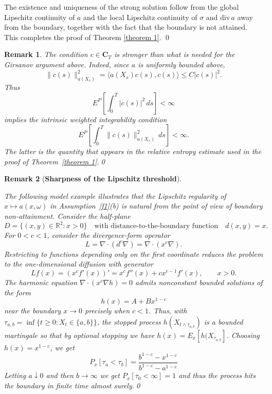 \documentclass[11pt]{article}
\newcommand{\R}{\mathbb R}
\theoremstyle{rem}
\newtheorem{remark}{Remark}[section]
\begin{document}
The existence and uniqueness of the strong solution follow from the global Lipschitz continuity of $a$ and the local Lipschitz continuity of $\sigma$ and $\mathrm{div}\,a$ away from the boundary, together with the fact that the boundary is not attained. This completes the proof of Theorem \ref{theorem 1}.
\qed

\begin{remark}\label{remark:weighted}
The condition $c\in \mathbf C_T$ is stronger than what is needed for the
Girsanov argument above. Indeed, since $a$ is uniformly bounded above,
\[
\|c(s)\|_{a(X_s)}^2
=
\langle a(X_s)c(s),c(s)\rangle
\leq C |c(s)|^2.
\]
Thus
\[
E^P\left[\int_0^T |c(s)|^2\,ds\right]<\infty
\]
implies the intrinsic weighted integrability condition
\[
E^P\left[\int_0^T \|c(s)\|_{a(X_s)}^2\,ds\right]<\infty.
\]
The latter is the quantity that appears in the relative entropy estimate
used in the proof of Theorem~\ref{theorem 1}.\qed 
\end{remark}

\begin{remark}[{\bf Sharpness of the Lipschitz threshold}]
\label{remark:sharpness}

The following model example illustrates that the Lipschitz regularity of $x\mapsto a(x,\omega)$ in Assumption~\ref{f1}(b) is natural from the point of view of boundary non-attainment. Consider the half-plane
\[
D=\{(x,y)\in\R^2:x>0\}
\quad\mbox{with distance-to-the-boundary function}\quad 
d(x,y)=x.
\]
For $0<c<1$, consider the divergence-form operator
\[
L=\nabla\cdot(d^c\nabla)
=
\nabla\cdot(x^c\nabla).
\]
Restricting to functions depending only on the first coordinate reduces the problem to the one-dimensional diffusion with generator
\[
Lf(x)
=
(x^c f'(x))'
=
x^c f''(x)+c x^{c-1}f'(x),
\qquad x>0.
\]
The harmonic equation $\nabla\cdot(x^c\nabla h)=0$
admits nonconstant bounded solutions of the form
\[
h(x)=A+B x^{1-c}
\]
near the boundary $x\to 0$ precisely when $c<1$. Thus, with $\tau_{a,b}= \inf\{t\geq 0: X_t\in \{a,b\}\}$, the stopped process $h(X_{t\wedge\tau_{a,b}})$ is a bounded martingale so that by optional stopping we have $h(x)=E_x[h(X_{\tau_{a,b}}]$. Choosing $h(x)=x^{1-c}$, we get 
$$
P_x[\tau_a<\tau_b]= \frac{b^{1-c}- x^{1-c}}{b^{1-c}-a^{1-c}}
$$
Letting $a\downarrow 0$ and then $b\to\infty$ we get $P_x[\tau_0<\infty]=1$ and thus the process hits the boundary in finite time almost surely.\qed
\end{remark}




\end{document}
